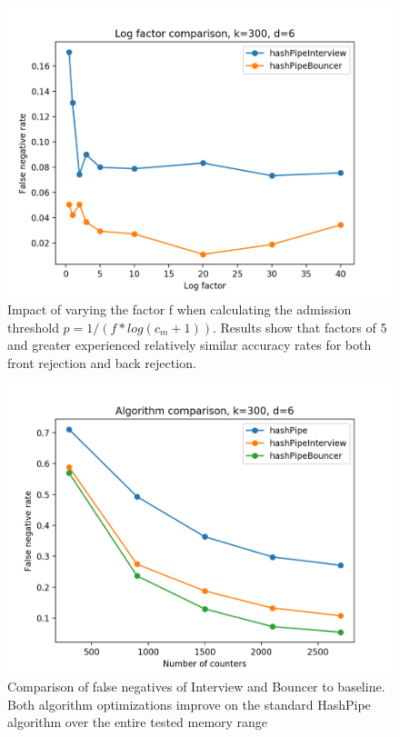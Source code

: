 \begin{figure}[t]
  \centering
    \includegraphics[scale=0.5]{log}
     \caption{Impact of varying the factor f when calculating the admission threshold $p = 1 / (f*log(c_m + 1))$. Results show that factors of 5 and greater experienced relatively similar accuracy rates for both front rejection and back rejection.}
     \label{fig:bp-image}
\end{figure}

\begin{figure}[t]
  \centering
    \includegraphics[scale=0.5]{falsenegatives}
     \caption{Comparison of false negatives of Interview and Bouncer to baseline. Both algorithm optimizations improve on the standard HashPipe algorithm over the entire tested memory range}
     \label{fig:bp-image}
\end{figure}

